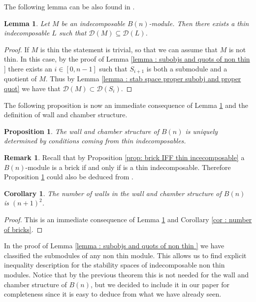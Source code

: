 \documentclass[11pt]{amsart}
\newtheorem{proposition}[theorem]{Proposition}
\newtheorem{corollary}[theorem]{Corollary}
\newtheorem{lemma}[theorem]{Lemma}
\theoremstyle{definition}
\newtheorem{remark}[theorem]{Remark}
\begin{document}
The following lemma can be also found in \cite{asai}.

\begin{lemma}\label{lemma : stab spaces of non thin do not give new walls}
    Let $M$ be an indecomposable $B(n)$-module. Then there exists a thin  indecomposable  $L$ such that $\mathcal{D}(M)\subseteq  \mathcal{D}(L)$.
\end{lemma}
\begin{proof}If $M$ is thin the statement is trivial, so that we can assume that $M$ is not thin. In this case, by the proof of Lemma \ref{lemma : subobjs and quots of non thin }
 there exists an $i\in [0,n-1]$ such that $S_{i+1}$ is both a submodule and a quotient of $M$. Thus by Lemma \ref{lemma : stab space proper subobj and proper quot} we have that $\mathcal{D}(M)\subset \mathcal{D}(S_i)$.
\end{proof}

The following proposition is now an immediate consequence of Lemma \ref{lemma : stab spaces of non thin do not give new walls} and the definition of wall and chamber structure.

\begin{proposition}\label{theorem : rooty_walls}
    The wall and chamber structure of $B(n)$ is uniquely determined by conditions coming from thin indecomposables.
\end{proposition}

\begin{remark}
   Recall that by Proposition \ref{prop:  brick IFF thin incecomposable} a $B(n)$-module is a brick if and only if is a thin indecomposable. Therefore Proposition \ref{theorem : rooty_walls} could also be deduced from  \cite[Proposition 2.7]{asai}.
\end{remark}

\begin{corollary}\label{cor:number_of_walls}
    The number of walls in the wall and chamber structure of $B(n)$ is $(n+1)^2$.
\end{corollary}
\begin{proof}
    This is an immediate consequence of Lemma \ref{lemma : stab spaces of non thin do not give new walls} and Corollary \ref{cor : number of bricks}. 
\end{proof}

In the proof of Lemma \ref{lemma : subobjs and quots of non thin } we have classified the submodules of any non thin module. This allows us to find explicit inequality description for the stability spaces of indecomposable non thin modules. Notice that by the previous theorem this is not needed for the wall and chamber structure of $B(n)$, but we decided to include it in our paper for completeness since it is easy to deduce from what we have already seen. 
\end{document}
